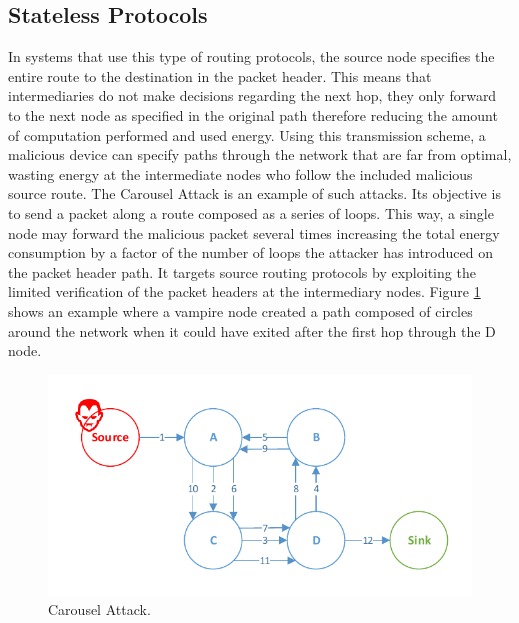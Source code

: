 \documentclass{sig-alternate-05-2015}
\begin{document}
\subsection{Stateless Protocols}
\label{sec:source_routing}
In systems that use this type of routing protocols, the source node specifies the entire route to the destination in the packet header. This means that intermediaries do not make decisions regarding the next hop, they only forward to the next node as specified in the original path therefore reducing the amount of computation performed and used energy. Using this transmission scheme, a malicious device can specify paths through the network that are far from optimal, wasting energy at the intermediate nodes who follow the included malicious source route. The Carousel Attack is an example of such attacks. Its objective is to send a packet along a route composed as a series of loops. This way, a single node may forward the malicious packet several times increasing the total energy consumption by a factor of the number of loops the attacker has introduced on the packet header path. It targets source routing protocols by exploiting the limited verification of the packet headers at the intermediary nodes. Figure \ref{fig:carousel_attack} shows an example where a vampire node created a path composed of circles around the network when it could have exited after the first hop through the D node.
 
\begin{figure}[h]
  \centering
  \includegraphics[width=0.9\linewidth]{figures/Carousel_Attack.pdf}
  \caption{Carousel Attack.}
  \label{fig:carousel_attack}
\end{figure}
\end{document}
